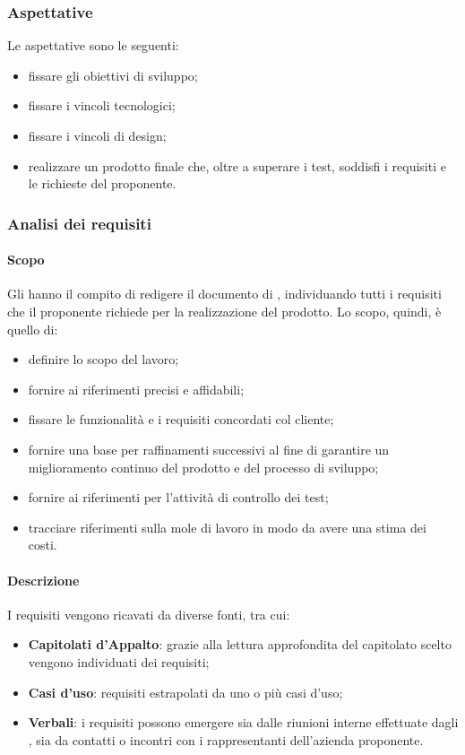 \subsubsection{Aspettative}
Le aspettative sono le seguenti:
\begin{itemize}
	\item fissare gli obiettivi di sviluppo;
	\item fissare i vincoli tecnologici;
	\item fissare i vincoli di design;
	\item realizzare un prodotto finale che, oltre a superare i test, soddisfi i requisiti e le richieste del proponente.
\end{itemize}
\subsubsection{Analisi dei requisiti}
\paragraph{Scopo}
Gli \anas{} hanno il compito di redigere il documento di \AdR{}, individuando tutti i requisiti che il proponente richiede per la realizzazione del prodotto. Lo scopo, quindi, è quello di:
\begin{itemize}
	\item definire lo scopo del lavoro;
	\item fornire ai \progs{} riferimenti precisi e affidabili;
	\item fissare le funzionalità e i requisiti concordati col cliente;
	\item fornire una base per raffinamenti successivi al fine di garantire un miglioramento continuo del prodotto e del processo di sviluppo;
	\item fornire ai \vers{} riferimenti per l'attività di controllo dei test;
	\item tracciare riferimenti sulla mole di lavoro in modo da avere una stima dei costi.
\end{itemize}
\paragraph{Descrizione}
I requisiti vengono ricavati da diverse fonti, tra cui:
\begin{itemize}
	\item \textbf{Capitolati d'Appalto}: grazie alla lettura approfondita del capitolato scelto vengono individuati dei requisiti;
	\item \textbf{Casi d'uso}: requisiti estrapolati da uno o più casi d'uso; 
	\item \textbf{Verbali}: i requisiti possono emergere sia dalle riunioni interne effettuate dagli \anas{}, sia da contatti o incontri con i rappresentanti dell'azienda proponente.
\end{itemize}
